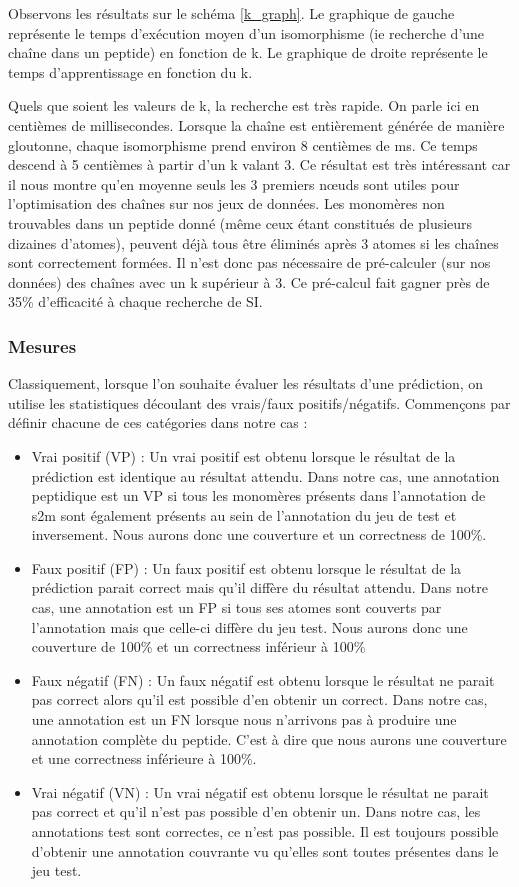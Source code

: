 Observons les résultats sur le schéma \ref{k_graph}.
Le graphique de gauche représente le temps d'exécution moyen d'un isomorphisme (ie recherche d'une chaîne dans un peptide) en fonction de k.
Le graphique de droite représente le temps d'apprentissage en fonction du k.

Quels que soient les valeurs de k, la recherche est très rapide.
On parle ici en centièmes de millisecondes.
Lorsque la chaîne est entièrement générée de manière gloutonne, chaque isomorphisme prend environ 8 centièmes de ms.
Ce temps descend à 5 centièmes à partir d'un k valant 3.
Ce résultat est très intéressant car il nous montre qu'en moyenne seuls les 3 premiers n\oe{}uds sont utiles pour l'optimisation des chaînes sur nos jeux de données.
Les monomères non trouvables dans un peptide donné (même ceux étant constitués de plusieurs dizaines d'atomes), peuvent déjà tous être éliminés après 3 atomes si les chaînes sont correctement formées.
Il n'est donc pas nécessaire de pré-calculer (sur nos données) des chaînes avec un k supérieur à 3.
Ce pré-calcul fait gagner près de 35\% d'efficacité à chaque recherche de SI.


\subsubsection{Mesures}

Classiquement, lorsque l'on souhaite évaluer les résultats d'une prédiction, on utilise les statistiques découlant des vrais/faux positifs/négatifs.
Commençons par définir chacune de ces catégories dans notre cas :
\begin{itemize}
 \item Vrai positif (VP) : Un vrai positif est obtenu lorsque le résultat de la prédiction est identique au résultat attendu.
Dans notre cas, une annotation peptidique est un VP si tous les monomères présents dans l'annotation de s2m sont également présents au sein de l'annotation du jeu de test et inversement.
Nous aurons donc une couverture et un correctness de 100\%.
 \item Faux positif (FP) : Un faux positif est obtenu lorsque le résultat de la prédiction parait correct mais qu'il diffère du résultat attendu.
Dans notre cas, une annotation est un FP si tous ses atomes sont couverts par l'annotation mais que celle-ci diffère du jeu test.
Nous aurons donc une couverture de 100\% et un correctness inférieur à 100\%
 \item Faux négatif (FN) : Un faux négatif est obtenu lorsque le résultat ne parait pas correct alors qu'il est possible d'en obtenir un correct.
Dans notre cas, une annotation est un FN lorsque nous n'arrivons pas à produire une annotation complète du peptide.
C'est à dire que nous aurons une couverture et une correctness inférieure à 100\%.
 \item Vrai négatif (VN) : Un vrai négatif est obtenu lorsque le résultat ne parait pas correct et qu'il n'est pas possible d'en obtenir un.
Dans notre cas, les annotations test sont correctes, ce n'est pas possible.
Il est toujours possible d'obtenir une annotation couvrante vu qu'elles sont toutes présentes dans le jeu test.
\end{itemize}


